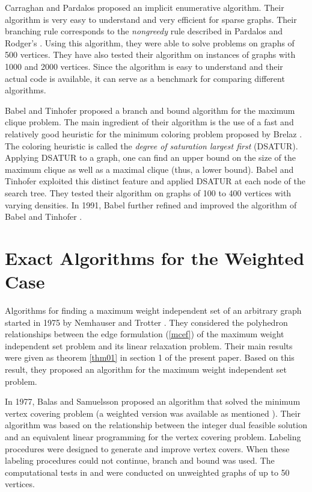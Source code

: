Carraghan and Pardalos \cite{CaPa90.1} proposed an implicit
enumerative algorithm. Their algorithm is very easy to understand
and very efficient for sparse graphs. Their
branching rule corresponds to the {\em nongreedy} rule described in
Pardalos and Rodger's \cite{PaRo92}. Using this algorithm, they were
able to solve problems on graphs of 500 vertices. They have also
tested their algorithm on instances of graphs with 1000 and 2000
vertices. Since the algorithm is easy to understand and their actual
code is available, it can serve as a benchmark for comparing
different algorithms.

Babel and Tinhofer \cite{BaTi90} proposed a branch and bound
algorithm for the maximum clique problem. The main ingredient of
their algorithm is the use of a fast and relatively good heuristic
for the minimum coloring problem proposed by Brelaz \cite{Bre79}.
The coloring heuristic is called the {\em degree of saturation
largest first} (DSATUR). Applying DSATUR to a graph, one can find an
upper bound on the size of the maximum clique as well as a maximal
clique (thus, a lower bound). Babel and Tinhofer exploited this
distinct feature and applied DSATUR at each node of the search tree.
They tested their algorithm on graphs of 100 to 400 vertices with
varying densities. In 1991, Babel \cite{Bab91} further refined and
improved the algorithm of Babel and Tinhofer \cite{BaTi90}. 



\section{Exact Algorithms for the Weighted Case}

Algorithms for finding a maximum weight independent set of an
arbitrary graph started in 1975 by Nemhauser and Trotter
\cite{NeTr75}. They considered the polyhedron relationships between
the edge formulation (\ref{mcef}) of the maximum weight independent
set problem and its linear relaxation problem. Their main results
were given as theorem \ref{thm01} in section 1 of the
present paper. Based on this result, they proposed an algorithm for
the maximum weight independent set problem.

In 1977, Balas and Samuelsson \cite{BaSa77} proposed an algorithm
that solved the minimum vertex covering problem (a weighted version
was available as mentioned \cite{BaSa77}). Their algorithm was based
on the relationship between the integer dual feasible solution and
an equivalent linear programming for the vertex covering problem.
Labeling procedures were designed to generate and improve vertex
covers. When these labeling procedures could not continue, branch
and bound was used. The computational tests in \cite{NeTr75} and
\cite{BaSa77} were conducted on unweighted graphs of up to 50
vertices. 


